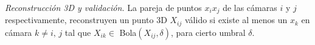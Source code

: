 \textit{Reconstrucción 3D y validación.}\label{seccion_reconstruccion3D_validacion}
La pareja de puntos $x_i x_j$ de las cámaras $i$ y $j$ respectivamente, reconstruyen un punto 3D $X_{ij}$ válido si existe al menos un $x_k$ en cámara $k\not= i, \,j$ tal que $X_{ik} \in $ Bola$(X_{ij}, \delta)$, para cierto umbral $\delta$.
%
%
%
%

